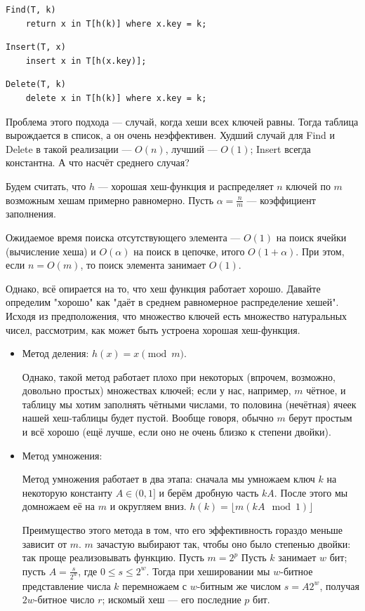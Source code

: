 \documentclass[a4paper,12pt]{article}
\begin{document}
\begin{lstlisting}
Find(T, k)
    return x in T[h(k)] where x.key = k;
\end{lstlisting}

\begin{lstlisting}
Insert(T, x)
    insert x in T[h(x.key)];
\end{lstlisting}

\begin{lstlisting}
Delete(T, k)
    delete x in T[h(k)] where x.key = k;
\end{lstlisting}

Проблема этого подхода --- случай, когда хеши всех ключей равны. Тогда таблица вырождается в список, а он очень неэффективен. Худший случай для Find и Delete в такой реализации --- $O(n)$, лучший --- $O(1)$; Insert всегда константна. А что насчёт среднего случая?

Будем считать, что $h$ --- хорошая хеш-функция и распределяет $n$ ключей по $m$ возможным хешам примерно равномерно. Пусть $\alpha = \frac{n}{m}$ --- коэффициент заполнения.

Ожидаемое время поиска отсутствующего элемента --- $O(1)$ на поиск ячейки (вычисление хеша) и $O(\alpha)$ на поиск в цепочке, итого $O(1+\alpha)$. При этом, если $n = O(m)$, то поиск элемента занимает $O(1)$.

Однако, всё опирается на то, что хеш функция работает хорошо. Давайте определим "хорошо" как "даёт в среднем равномерное распределение хешей". Исходя из предположения, что множество ключей есть множество натуральных чисел, рассмотрим, как может быть устроена хорошая хеш-функция.

\begin{itemize}
\item
Метод деления:
$h(x) = x \pmod{m}$.

Однако, такой метод работает плохо при некоторых (впрочем, возможно, довольно простых) множествах ключей; если у нас, например, $m$ чётное, и таблицу мы хотим заполнять чётными числами, то половина (нечётная) ячеек нашей хеш-таблицы будет пустой. Вообще говоря, обычно $m$ берут простым и всё хорошо (ещё лучше, если оно не очень близко к степени двойки).

\item
Метод умножения:

Метод умножения работает в два этапа: сначала мы умножаем ключ $k$ на некоторую константу $A \in (0, 1]$ и берём дробную часть $kA$. После этого мы домножаем её на $m$ и округляем вниз. 
$h(k) = \lfloor m(kA \mod{1})\rfloor$

Преимущество этого метода в том, что его эффективность гораздо меньше зависит от $m$. $m$ зачастую выбирают так, чтобы оно было степенью двойки: так проще реализовывать функцию. Пусть $m = 2^p$ Пусть $k$ занимает $w$ бит; пусть $A = \frac{s}{2^w}$, где $0\leqslant s \leqslant 2^w$. Тогда при хешировании мы $w$-битное представление числа $k$ перемножаем с $w$-битным же числом $s = A2^w$, получая $2w$-битное число $r$; искомый хеш --- его последние $p$ бит.
\end{itemize}
\end{document}
